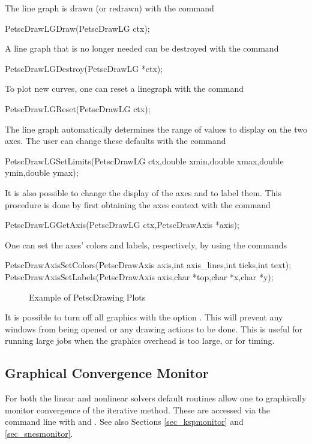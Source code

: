 {{{The line graph is drawn (or redrawn) with the command 
\begin{tabbing}
  PetscDrawLGDraw(PetscDrawLG ctx);
\end{tabbing}
A line graph that is no longer needed can be destroyed with the 
command 
\begin{tabbing}
  PetscDrawLGDestroy(PetscDrawLG *ctx);
\end{tabbing}
To plot new curves, one can reset a linegraph with the
command 
\begin{tabbing}
  PetscDrawLGReset(PetscDrawLG ctx);
\end{tabbing}
The line graph automatically determines the range of values to 
display on the two axes.  The user can change these defaults with the 
command 
\begin{tabbing}
  PetscDrawLGSetLimits(PetscDrawLG ctx,double xmin,double xmax,double ymin,double ymax);
\end{tabbing}

It is also possible to change the display of the axes and to label
them. This procedure is done by first obtaining the axes context with the 
command  
\begin{tabbing}
  PetscDrawLGGetAxis(PetscDrawLG ctx,PetscDrawAxis *axis);
\end{tabbing}
One can set the axes' colors and labels, respectively, by using the
commands 
\begin{tabbing}
  PetscDrawAxisSetColors(PetscDrawAxis axis,int axis\_lines,int ticks,int text);\\
  PetscDrawAxisSetLabels(PetscDrawAxis axis,char *top,char *x,char *y);
\end{tabbing}

\begin{figure}[H]
{\small
{}
}
\caption{Example of PetscDrawing Plots}
\label{fig_plot}
\end{figure}

It is possible to turn off all graphics with the option 
. This
will prevent any windows from being opened or any drawing actions to be done.
This is useful for running large jobs when the graphics overhead is too
large, or for timing.

\subsection{Graphical Convergence Monitor}
For both the linear and nonlinear solvers default routines
allow one to graphically monitor convergence of the iterative method.
These are accessed via the command line with 
 and . 
 See also Sections \ref{sec_kspmonitor} and
\ref{sec_snesmonitor}. 

}}}
